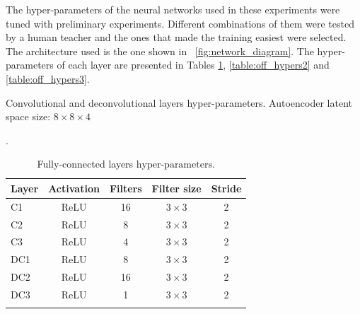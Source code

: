The hyper-parameters of the neural networks used in these experiments were tuned with preliminary experiments. Different combinations of them were tested by a human teacher and the ones that made the training easiest were selected. The architecture used is the one shown in \figurename~{\ref{fig:network_diagram}}. The hyper-parameters of each layer are presented in Tables \ref{table:off_hypers1}, \ref{table:off_hypers2} and \ref{table:off_hypers3}.

\begin{table}[h]
\parbox{\linewidth}{
\centering
\caption{Convolutional and deconvolutional layers hyper-parameters. Autoencoder latent space size: $8\times8\times4$}.
\label{table:off_hypers1}
\begin{tabular}{lcccc}
\textbf{Layer} & \multicolumn{1}{l}{\textbf{Activation}} & \multicolumn{1}{l}{\textbf{Filters}} & \multicolumn{1}{l}{\textbf{Filter size}} & \multicolumn{1}{l}{\textbf{Stride}} \\ \hline \hline
C1             & ReLU                                    & 16                                   & $3\times3$                                    & 2                                   \\ \hline
C2             & ReLU                                    & 8                                    & $3\times3$                                    & 2                                   \\ \hline
C3             & ReLU                                    & 4                                    & $3\times3$                                    & 2                                   \\ \hline
DC1            & ReLU                                    & 8                                    & $3\times3$                                    & 2                                   \\ \hline
DC2            & ReLU                                    & 16                                   & $3\times3$                                    & 2                                   \\ \hline
DC3            & ReLU                                    & 1                                    & $3\times3$                                    & 2                                   \\ \hline
\vspace{0.2cm}
\end{tabular}}
\hfill
\parbox{.45\linewidth}{
\centering
\caption{Fully-connected layers $\text{hyper-parameters}$.}
}
\end{table}
